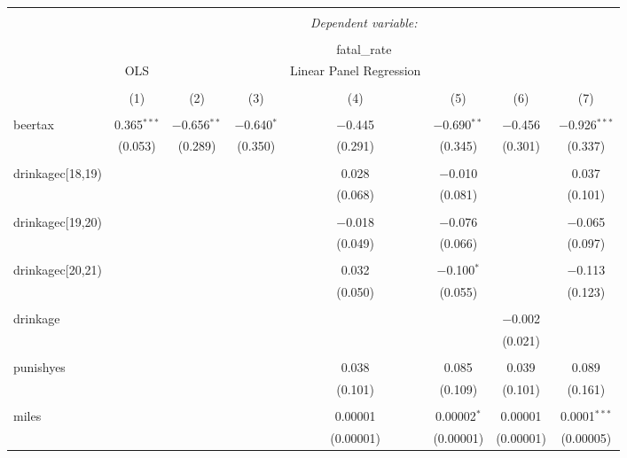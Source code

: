 \documentclass[]{book}
\theoremstyle{definition}
\theoremstyle{definition}
\theoremstyle{definition}
\theoremstyle{remark}
\begin{document}
\begin{table} \centering 
  \caption{} 
  \label{} 
\begin{tabular}{@{\extracolsep{-5pt}}lccccccc} 
\\[-1.8ex]\hline 
\hline \\[-1.8ex] 
 & \multicolumn{7}{c}{\textit{Dependent variable:}} \\ 
\cline{2-8} 
\\[-1.8ex] & \multicolumn{7}{c}{fatal\_rate} \\ 
 & OLS &  &  & Linear Panel Regression &  &  &  \\ 
\\[-1.8ex] & (1) & (2) & (3) & (4) & (5) & (6) & (7)\\ 
\hline \\[-1.8ex] 
 beertax & 0.365$^{***}$ & $-$0.656$^{**}$ & $-$0.640$^{*}$ & $-$0.445 & $-$0.690$^{**}$ & $-$0.456 & $-$0.926$^{***}$ \\ 
  & (0.053) & (0.289) & (0.350) & (0.291) & (0.345) & (0.301) & (0.337) \\ 
  & & & & & & & \\ 
 drinkagec[18,19) &  &  &  & 0.028 & $-$0.010 &  & 0.037 \\ 
  &  &  &  & (0.068) & (0.081) &  & (0.101) \\ 
  & & & & & & & \\ 
 drinkagec[19,20) &  &  &  & $-$0.018 & $-$0.076 &  & $-$0.065 \\ 
  &  &  &  & (0.049) & (0.066) &  & (0.097) \\ 
  & & & & & & & \\ 
 drinkagec[20,21) &  &  &  & 0.032 & $-$0.100$^{*}$ &  & $-$0.113 \\ 
  &  &  &  & (0.050) & (0.055) &  & (0.123) \\ 
  & & & & & & & \\ 
 drinkage &  &  &  &  &  & $-$0.002 &  \\ 
  &  &  &  &  &  & (0.021) &  \\ 
  & & & & & & & \\ 
 punishyes &  &  &  & 0.038 & 0.085 & 0.039 & 0.089 \\ 
  &  &  &  & (0.101) & (0.109) & (0.101) & (0.161) \\ 
  & & & & & & & \\ 
 miles &  &  &  & 0.00001 & 0.00002$^{*}$ & 0.00001 & 0.0001$^{***}$ \\ 
  &  &  &  & (0.00001) & (0.00001) & (0.00001) & (0.00005) \\ 

\end{tabular}
\end{table}
\end{document}
